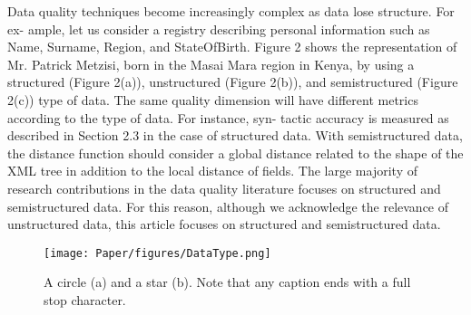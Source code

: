 \documentclass[pdftex,english,oribibl]{llncs}
\begin{document}
    Data quality techniques become increasingly complex as data lose structure. For ex- ample, let us consider a registry describing personal information such as Name, Surname, Region, and StateOfBirth. Figure 2 shows the representation of Mr. Patrick Metzisi, born in the Masai Mara region in Kenya, by using a structured (Figure 2(a)), unstructured (Figure 2(b)), and semistructured (Figure 2(c)) type of data. The same quality dimension will have different metrics according to the type of data. For instance, syn- tactic accuracy is measured as described in Section 2.3 in the case of structured data. With semistructured data, the distance function should consider a global distance related to the shape of the XML tree in addition to the local distance of fields.
    The large majority of research contributions in the data quality literature focuses on structured and semistructured data. For this reason, although we acknowledge the relevance of unstructured data, this article focuses on structured and semistructured data.


    \begin{figure}
        \centering
        \texttt{[image: Paper/figures/DataType.png]}
        \caption{A circle (a) and a star (b). Note that any caption ends with a full stop character.}
        \label{fig:subfig}
    \end{figure}
\end{document}

